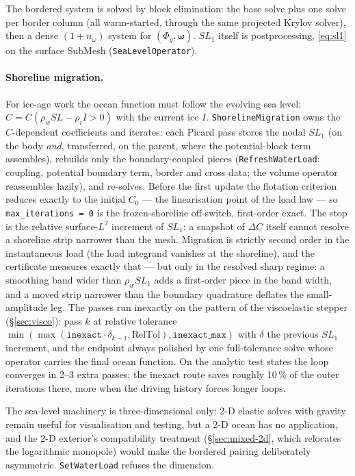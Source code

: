 \documentclass[11pt]{article}
\numberwithin{equation}{section}
\theoremstyle{remark}
\newcommand{\code}[1]{\texttt{#1}}
\begin{document}
The bordered system is solved by block elimination: the base solve plus
one solve per border column (all warm-started, through the same projected
Krylov solver), then a dense $(1 + n_\omega)$ system for
$(\Phi_g, \bm\omega)$. $SL_1$ itself is postprocessing, \eqref{eq:sl1} on
the surface SubMesh (\code{SeaLevelOperator}).

\paragraph{Shoreline migration.} For ice-age work the ocean function must
follow the evolving sea level: $C = C(\rho_w SL - \rho_i I > 0)$ with the
current ice $I$. \code{ShorelineMigration} owns the $C$-dependent
coefficients and iterates: each Picard pass stores the nodal $SL_1$ (on
the body \emph{and}, transferred, on the parent, where the potential-block
term assembles), rebuilds only the boundary-coupled pieces
(\code{RefreshWaterLoad}: coupling, potential boundary term, border and
cross data; the volume operator reassembles lazily), and re-solves.
Before the first update the flotation criterion reduces exactly to the
initial $C_0$ --- the linearisation point of the load law --- so
\code{max\_iterations = 0} is the frozen-shoreline off-switch, first-order
exact. The stop is the relative surface-$L^2$ increment of $SL_1$: a
snapshot of $\Delta C$ itself cannot resolve a shoreline strip narrower
than the mesh. Migration is strictly second order in the instantaneous
load (the load integrand vanishes at the shoreline), and the
certificate measures exactly that --- but only in the resolved sharp
regime: a smoothing band wider than $\rho_w SL_1$ adds a first-order
piece in the band width, and a moved strip narrower than the boundary
quadrature deflates the small-amplitude leg. The passes run inexactly on
the pattern of the viscoelastic stepper (\S\ref{sec:visco}): pass $k$ at
relative tolerance $\min(\max(\code{inexact}\cdot\delta_{k-1},
\text{RelTol}), \code{inexact\_max})$ with $\delta$ the previous $SL_1$
increment, and the endpoint always polished by one full-tolerance solve
whose operator carries the final ocean function. On the analytic test
states the loop converges in 2--3 extra passes; the inexact route saves
roughly 10\,\% of the outer iterations there, more when the driving
history forces longer loops.

The sea-level machinery is three-dimensional only: 2-D elastic solves
with gravity remain useful for visualisation and testing, but a 2-D
ocean has no application, and the 2-D exterior's compatibility
treatment (\S\ref{sec:mixed-2d}, which relocates the logarithmic
monopole) would make the bordered pairing deliberately asymmetric.
\code{SetWaterLoad} refuses the dimension.
\end{document}
